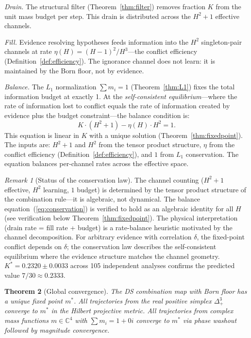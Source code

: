 \documentclass[11pt,a4paper]{article}
\newtheorem{theorem}{Theorem}[section]
\theoremstyle{definition}
\theoremstyle{remark}
\newtheorem{remark}[theorem]{Remark}
\newcommand{\C}{\mathbb{C}}
\begin{document}
\emph{Drain.} The structural filter (Theorem~\ref{thm:filter}) removes fraction $K$ from the unit mass budget per step. This drain is distributed across the $H^2+1$ effective channels.

\emph{Fill.} Evidence resolving hypotheses feeds information into the $H^2$ singleton-pair channels at rate $\eta(H)=(H-1)^2/H^3$---the conflict efficiency (Definition~\ref{def:efficiency}). The ignorance channel does not learn: it is maintained by the Born floor, not by evidence.

\emph{Balance.} The $L_1$ normalization $\sum m_i=1$ (Theorem~\ref{thm:L1}) fixes the total information budget at exactly 1. At the \emph{self-consistent equilibrium}---where the rate of information lost to conflict equals the rate of information created by evidence plus the budget constraint---the balance condition is:
\begin{equation}\label{eq:conservation}
K\cdot(H^2+1)-\eta(H)\cdot H^2=1.
\end{equation}
This equation is linear in $K$ with a unique solution (Theorem~\ref{thm:fixedpoint}). The inputs are: $H^2+1$ and $H^2$ from the tensor product structure, $\eta$ from the conflict efficiency (Definition~\ref{def:efficiency}), and $1$ from $L_1$ conservation. The equation balances per-channel rates across the effective space.

\begin{remark}[Status of the conservation law]\label{rem:conservation}
The channel counting ($H^2+1$ effective, $H^2$ learning, $1$ budget) is determined by the tensor product structure of the combination rule---it is algebraic, not dynamical. The balance equation~(\ref{eq:conservation}) is verified to hold as an algebraic identity for all $H$ (see verification below Theorem~\ref{thm:fixedpoint}). The physical interpretation (drain rate = fill rate + budget) is a rate-balance heuristic motivated by the channel decomposition. For arbitrary evidence with correlation $\delta$, the fixed-point conflict depends on $\delta$; the conservation law describes the self-consistent equilibrium where the evidence structure matches the channel geometry. $K^*=0.2320\pm 0.0033$ across 105 independent analyses confirms the predicted value $7/30\approx 0.2333$.
\end{remark}

\begin{theorem}[Global convergence]\label{thm:basin}
The DS combination map with Born floor has a unique fixed point $m^*$. All trajectories from the real positive simplex $\Delta^3_+$ converge to $m^*$ in the Hilbert projective metric. All trajectories from complex mass functions $m\in\C^4$ with $\sum m_i=1+0i$ converge to $m^*$ via phase washout followed by magnitude convergence.
\end{theorem}
\end{document}
